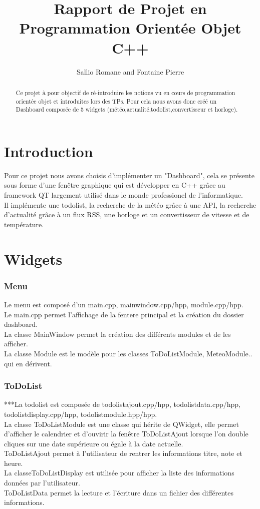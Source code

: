 \documentclass[12pt]{report}
\title{Rapport de Projet en Programmation Orientée Objet C++}
\author{Sallio Romane and Fontaine Pierre}
\begin{document}
  \maketitle
  \newpage
  \tableofcontents
  \begin{abstract}
    Ce projet à pour objectif de ré-introduire les notions vu en cours de programmation orientée objet et introduites lors des TPs. Pour cela nous avons donc créé un Dashboard composée de 5 widgets (météo,actualité,todolist,convertisseur et horloge).  
  \end{abstract}
  \newpage
  \part{Introduction}
    Pour ce projet nous avons choisis d'implémenter un "Dashboard", cela se présente sous forme d'une fenêtre graphique qui est développer en C++ grâce au framework QT largement utilisé dans le monde professionel de l'informatique.\\
    Il implémente une todolist, la recherche de la météo grâce à une API, la recherche d'actualité grâce à un flux RSS, une horloge et un convertisseur de vitesse et de température.
  \part{Widgets}
  \section{Menu}
    Le menu est composé d'un main.cpp, mainwindow.cpp/hpp, module.cpp/hpp.\\
    Le main.cpp permet l'affichage de la fentere principal et la création du dossier dashboard.\\
    La classe MainWindow permet la création des différents modules et de les afficher.\\
    La classe Module est le modèle pour les classes ToDoListModule, MeteoModule.. qui en dérivent.\\
  \section{ToDoList}
    ***La todolist est composée de todolistajout.cpp/hpp, todolistdata.cpp/hpp, todolistdisplay.cpp/hpp, todolistmodule.hpp/hpp.\\
    La classe ToDoListModule est une classe qui hérite de QWidget, elle permet d'afficher le calendrier et d'ouvirir la fenêtre ToDoListAjout lorsque l'on double cliques sur une date supérieure ou égale à la date actuelle.\\
    ToDoListAjout permet à l'utilisateur de rentrer les informations titre, note et heure.\\
    La classeToDoListDisplay est utilisée pour afficher la liste des informations données par l'utilisateur.\\
    ToDoListData permet la lecture et l'écriture dans un fichier des différentes informations.
\end{document}

